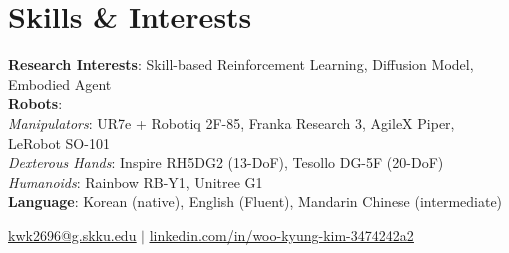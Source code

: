 \documentclass[letterpaper,11pt]{article}
\begin{document}


\section{Skills \& Interests}
 \begin{itemize}[leftmargin=0.15in, label={}]
    \small{\item{
    \textbf{Research Interests}{: Skill-based Reinforcement Learning, Diffusion Model, Embodied Agent} \\
    \vspace{1mm}
    \textbf{Robots}{:} \\
    \hspace{1em}\textit{Manipulators}{: UR7e + Robotiq 2F-85, Franka Research 3, AgileX Piper, LeRobot SO-101} \\
    \hspace{1em}\textit{Dexterous Hands}{: Inspire RH5DG2 (13-DoF), Tesollo DG-5F (20-DoF)} \\
    \hspace{1em}\textit{Humanoids}{: Rainbow RB-Y1, Unitree G1} \\
    \vspace{1mm}
    \textbf{Language}{: Korean (native), English (Fluent), Mandarin Chinese (intermediate)} \\
    }}
 \end{itemize}

\begin{center}

\href{mailto:kwk2696@g.skku.edu}{\underline{kwk2696@g.skku.edu}} $|$
\href{https://www.linkedin.com/in/woo-kyung-kim-3474242a2/}{\underline{linkedin.com/in/woo-kyung-kim-3474242a2}}
\end{center}
\end{document}

